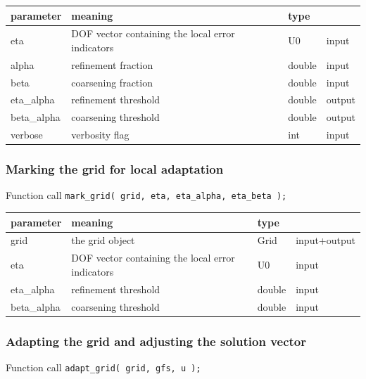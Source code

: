 \begin{tabular}{l|lll}
  parameter   & meaning                                          & type    &  \\
\hline
  eta         & DOF vector containing the local error indicators & U0      & input \\
  alpha       & refinement fraction                              & double  & input  \\
  beta        & coarsening fraction                              & double  & input  \\
  eta\_alpha  & refinement threshold                             & double  & output \\
  beta\_alpha & coarsening threshold                             & double  & output \\
  verbose     & verbosity flag                                   & int     & input  \\
\end{tabular}



\subsubsection*{Marking the grid for local adaptation}
\begin{block}{Function call}
  \lstinline{mark_grid( grid, eta, eta_alpha, eta_beta );}
\end{block}

\begin{tabular}{l|lll}
  parameter   & meaning                                          & type    &  \\
  \hline
  grid        & the grid object                                  & Grid    & input+output \\
  eta         & DOF vector containing the local error indicators & U0      & input \\
  eta\_alpha  & refinement threshold                             & double  & input \\
  beta\_alpha & coarsening threshold                             & double  & input \\
\end{tabular}


\subsubsection*{Adapting the grid and adjusting the solution vector}
\begin{block}{Function call}
  \lstinline{adapt_grid( grid, gfs, u );}
\end{block}

